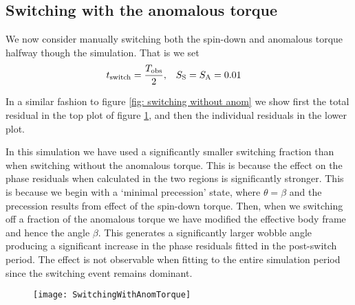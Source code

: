 \documentclass[../full_thesis/full_thesis.tex]{subfiles}
\begin{document}
\subsection{Switching with the anomalous torque}
We now consider manually switching both the spin-down and anomalous torque
halfway though the simulation.  That is we set
\begin{align}
    t_{\mathrm{switch}} = \frac{T_{\textrm{obs}}}{2}, &&& S_{\mathrm{S}} = S_{\mathrm{A}} = 0.01
\end{align}

In a similar fashion to figure \ref{fig: switching without anom} we show first
the total residual in the top plot of figure \ref{fig: switching with anom}, and
then the individual residuals in the lower plot.

In this simulation we have used a significantly smaller switching fraction 
than when switching without the anomalous torque. This is because the effect 
on the phase residuals when calculated in the two regions is significantly
stronger. This is because we begin with a `minimal precession' state, where
$\theta = \beta$ and the precession results from effect of the spin-down torque.
Then, when we switching off a fraction of the anomalous torque we have modified
the effective body frame and hence the angle $\beta$. This generates a significantly
larger wobble angle producing a significant increase in the phase residuals
fitted in the post-switch period. The effect is not observable when fitting
to the entire simulation period since the switching event remains dominant.

\begin{figure}[htb]
\texttt{[image: SwitchingWithAnomTorque]}
\caption{}
\label{fig: switching with anom}
\end{figure}
\end{document}
